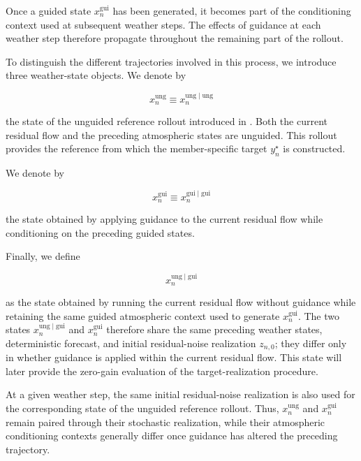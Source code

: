 Once a guided state $x_n^{\mathrm{gui}}$ has
been generated, it becomes part of the conditioning context used at subsequent
weather steps. The effects of guidance at each weather step therefore propagate throughout the remaining part of the rollout. 


To distinguish the different trajectories involved in this process, we
introduce three weather-state objects. We denote by

\[
    x_n^{\mathrm{ung}}
    \equiv
    x_n^{\mathrm{ung}\mid\mathrm{ung}}
\]

the state of the unguided reference rollout introduced in
. Both the current residual flow and the preceding atmospheric
states are unguided. This rollout provides the reference from which the
member-specific target $y_n^\star$ is constructed.

We denote by

\[
    x_n^{\mathrm{gui}}
    \equiv
    x_n^{\mathrm{gui}\mid\mathrm{gui}}
\]

the state obtained by applying guidance to the current residual flow while
conditioning on the preceding guided states.

Finally, we define

\[
    x_n^{\mathrm{ung}\mid\mathrm{gui}}
\]

as the state obtained by running the current residual flow without guidance
while retaining the same guided atmospheric context used to generate
$x_n^{\mathrm{gui}}$. The two states
$x_n^{\mathrm{ung}\mid\mathrm{gui}}$ and $x_n^{\mathrm{gui}}$ therefore share
the same preceding weather states, deterministic forecast, and initial
residual-noise realization $z_{n,0}$; they differ only in whether guidance is
applied within the current residual flow. This state will later provide the
zero-gain evaluation of the target-realization procedure.

At a given weather step, the same initial residual-noise realization is also
used for the corresponding state of the unguided reference rollout. Thus,
$x_n^{\mathrm{ung}}$ and $x_n^{\mathrm{gui}}$ remain paired through their
stochastic realization, while their atmospheric conditioning contexts
generally differ once guidance has altered the preceding trajectory.

